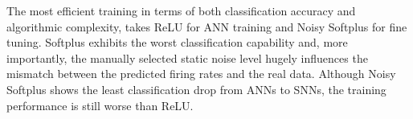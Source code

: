 \documentclass{article}
\begin{document}





The most efficient training in terms of both classification accuracy and algorithmic complexity, takes ReLU for ANN training and Noisy Softplus for fine tuning.
Softplus exhibits the worst classification capability and, more importantly, the manually selected static noise level hugely influences the mismatch between the predicted firing rates and the real data.
Although Noisy Softplus shows the least classification drop from ANNs to SNNs, the training performance is still worse than ReLU.
\end{document}
